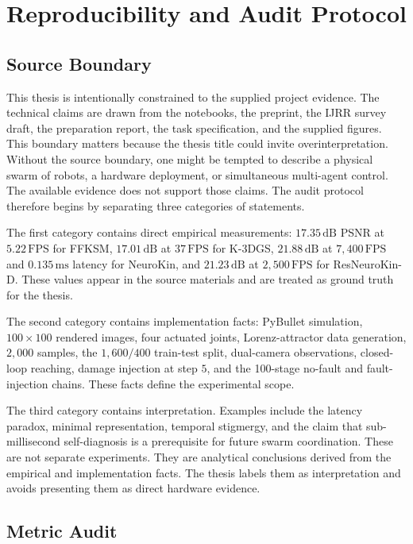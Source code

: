 \documentclass[12pt,a4paper,oneside]{report}
\begin{document}
\chapter{Reproducibility and Audit Protocol}

\section{Source Boundary}

This thesis is intentionally constrained to the supplied project evidence. The technical claims are drawn from the notebooks, the preprint, the IJRR survey draft, the preparation report, the task specification, and the supplied figures. This boundary matters because the thesis title could invite overinterpretation. Without the source boundary, one might be tempted to describe a physical swarm of robots, a hardware deployment, or simultaneous multi-agent control. The available evidence does not support those claims. The audit protocol therefore begins by separating three categories of statements.

The first category contains direct empirical measurements: $17.35\,\mathrm{dB}$ PSNR at $5.22\,\mathrm{FPS}$ for FFKSM, $17.01\,\mathrm{dB}$ at $37\,\mathrm{FPS}$ for K-3DGS, $21.88\,\mathrm{dB}$ at $7{,}400\,\mathrm{FPS}$ and $0.135\,\mathrm{ms}$ latency for NeuroKin, and $21.23\,\mathrm{dB}$ at $2{,}500\,\mathrm{FPS}$ for ResNeuroKin-D. These values appear in the source materials and are treated as ground truth for the thesis.

The second category contains implementation facts: PyBullet simulation, $100 \times 100$ rendered images, four actuated joints, Lorenz-attractor data generation, $2{,}000$ samples, the $1{,}600/400$ train-test split, dual-camera observations, closed-loop reaching, damage injection at step $5$, and the 100-stage no-fault and fault-injection chains. These facts define the experimental scope.

The third category contains interpretation. Examples include the latency paradox, minimal representation, temporal stigmergy, and the claim that sub-millisecond self-diagnosis is a prerequisite for future swarm coordination. These are not separate experiments. They are analytical conclusions derived from the empirical and implementation facts. The thesis labels them as interpretation and avoids presenting them as direct hardware evidence.

\section{Metric Audit}
\end{document}
